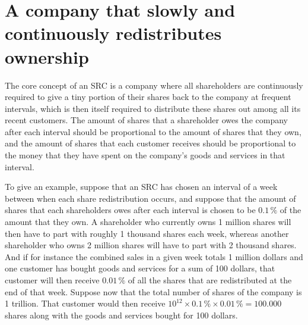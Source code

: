\documentclass{article}
\begin{document}
\section{A company that slowly and continuously redistributes ownership}
\label{sect_def}


The core concept of an SRC is a company where all shareholders are continuously required to give a tiny portion of their shares back to the company at frequent intervals, which is then itself required to distribute these shares out among all its recent customers. The amount of shares that a shareholder owes the company after each interval should be proportional to the amount of shares that they own, and the amount of shares that each customer receives should be proportional to the money that they have spent on the company's goods and services in that interval. 


To give an example, suppose that an SRC has chosen an interval of a week between when each share redistribution occurs, and suppose that the amount of shares that each shareholders owes after each interval is chosen to be $0.1\, \%$ of the amount that they own. A shareholder who currently owns 1 million shares will then have to part with roughly 1 thousand shares each week, whereas another shareholder who owns 2 million shares will have to part with 2 thousand shares. And if for instance the combined sales in a given week totals 1 million dollars and one customer has bought goods and services for a sum of 100 dollars, that customer will then receive $0.01\,\%$ of all the shares that are redistributed at the end of that week. 
Suppose now that the total number of shares of the company is 1 trillion. That customer would then receive $10^{12} \times 0.1\,\% \times 0.01\,\% = 100.000$ shares along with the goods and services bought for 100 dollars. 
\end{document}
